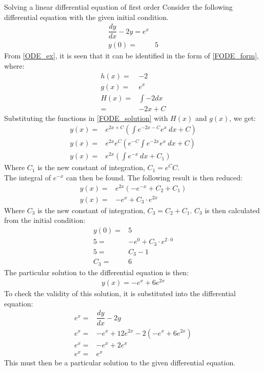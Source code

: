\begin{example}{Solving a linear differential equation of first order}{}
Consider the following differential equation with the given initial condition.
\begin{align}
	\dfrac{dy}{dx}-2y=e^x  \label{ODE_ex}\\ 
	y(0) =& 5 \nonumber
\end{align}
From \eqref{ODE_ex}, it is seen that it can be identified in the form of \eqref{FODE_form}, where:
\begin{align*}
	h(x) =& -2 \\
	g(x) =& e^x \\
	H(x) =& \int{-2 dx} \\
	     =& -2x + C
\end{align*}
Substituting the functions in \eqref{FODE_solution} with $H(x)$ and $g(x)$, we get: 
\begin{align*}
	y(x)=&e^{2x+C}(\int{e^{-2x-C}e^x\ dx}+C) \\
	y(x)=&e^{2x}e^{C}(e^{-C}\int{e^{-2x}e^{x}\ dx}+C) \\
	y(x)=&e^{2x}(\int{e^{-x}\ dx}+C_{1})
\end{align*}
Where $C_{1}$ is the new constant of integration, $C_1=e^{C}C$. \\
The integral of $e^{-x}$ can then be found. The following result is then reduced:
\begin{align*}
	y(x)=&e^{2x}(-e^{-x}+C_{2}+C_{1}) \\
	y(x)=&-e^x+C_{3} \cdot e^{2x}
\end{align*}
Where $C_{3}$ is the new constant of integration, $C_{3}=C_{2}+C_{1}$. $C_{3}$ is then calculated from the initial condition:
\begin{align*}
	y(0)=&5 \\
	5=&-e^0+C_{3} \cdot e^{2 \cdot 0} \\
	5 =& C_{3}-1 \\
	C_{3} =& 6
\end{align*}
The particular solution to the differential equation is then:
\begin{align*}
	y(x) = -e^x+6e^{2x}
\end{align*}
To check the validity of this solution, it is substituted into the differential equation:
\begin{align*}
	e^x =& \dfrac{dy}{dx} -2y \\
	e^x =& -e^x+12e^{2x} -2(-e^x+6e^{2x})  \\
	e^x =& -e^x+2e^x  \\
	e^x =& e^x
\end{align*}
This must then be a particular solution to the given differential equation.
\end{example}

